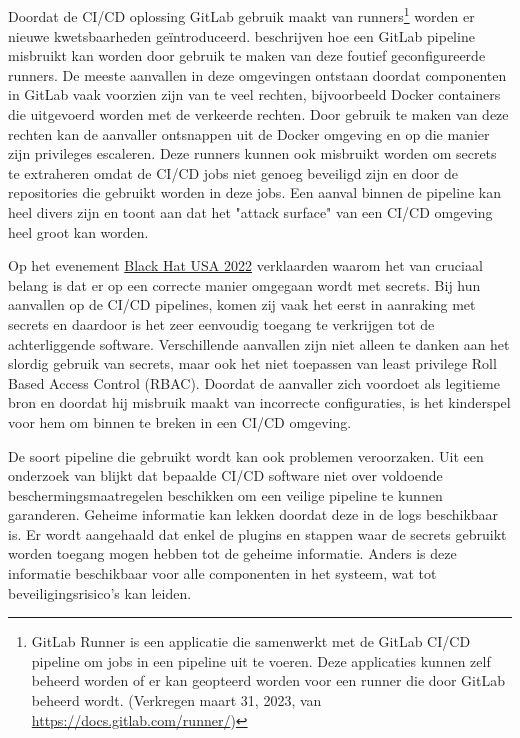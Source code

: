 \subsection{}
\label{sec:Praktische voorbeelden uit de securitywereld}
Doordat de CI/CD oplossing GitLab gebruik maakt van runners\footnote{GitLab Runner is een applicatie die samenwerkt met de GitLab CI/CD pipeline om jobs in een pipeline uit te voeren. Deze applicaties kunnen zelf beheerd worden of er kan geopteerd worden voor een runner die door GitLab beheerd wordt. (Verkregen maart 31, 2023, van \url{https://docs.gitlab.com/runner/})} worden er nieuwe kwetsbaarheden geïntroduceerd. \textcite{Haymore2022} beschrijven hoe een GitLab pipeline misbruikt kan worden door gebruik te maken van deze foutief geconfigureerde runners. De meeste aanvallen in deze omgevingen ontstaan doordat componenten in GitLab vaak voorzien zijn van te veel rechten, bijvoorbeeld Docker containers die uitgevoerd worden met de verkeerde rechten. Door gebruik te maken van deze rechten kan de aanvaller ontsnappen uit de Docker omgeving en op die manier zijn privileges escaleren. Deze runners kunnen ook misbruikt worden om secrets te extraheren omdat de CI/CD jobs niet genoeg beveiligd zijn en door de repositories die gebruikt worden in deze jobs. Een aanval binnen de pipeline kan heel divers zijn en toont aan dat het "attack surface" van een CI/CD omgeving heel groot kan worden.
\clearpage

Op het evenement \href{https://www.blackhat.com/us-22/}{Black Hat USA 2022} verklaarden \textcite{Smart2022} waarom het van cruciaal belang is dat er op een correcte manier omgegaan wordt met secrets. Bij hun aanvallen op de CI/CD pipelines, komen zij vaak het eerst in aanraking met secrets en daardoor is het zeer eenvoudig toegang te verkrijgen tot de achterliggende software. Verschillende aanvallen zijn niet alleen te danken aan het slordig gebruik van secrets, maar ook het niet toepassen van least privilege Roll Based Access Control (RBAC). Doordat de aanvaller zich voordoet als legitieme bron en doordat hij misbruik maakt van incorrecte configuraties, is het kinderspel voor hem om binnen te breken in een CI/CD omgeving.
\newline

De soort pipeline die gebruikt wordt kan ook problemen veroorzaken. Uit een onderzoek van \textcite{Koishybayev2022} blijkt dat bepaalde CI/CD software niet over voldoende beschermingsmaatregelen beschikken om een veilige pipeline te kunnen garanderen. Geheime informatie kan lekken doordat deze in de logs beschikbaar is. Er wordt aangehaald dat enkel de plugins en stappen waar de secrets gebruikt worden toegang mogen hebben tot de geheime informatie. Anders is deze informatie beschikbaar voor alle componenten in het systeem, wat tot beveiligingsrisico's kan leiden.
\newline 

